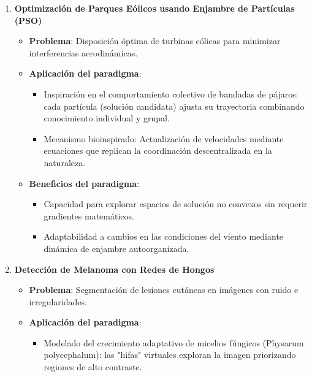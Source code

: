 \documentclass[14pt]{extarticle}
\begin{document}
  \begin{enumerate}
    \item \textbf{Optimización de Parques Eólicos usando Enjambre de Partículas (PSO)}

    \begin{itemize}
      \item \textbf{Problema}: Disposición óptima de turbinas eólicas para minimizar interferencias aerodinámicas.
      
      \item \textbf{Aplicación del paradigma}:

        \begin{itemize}
          \item Inspiración en el comportamiento colectivo de bandadas de pájaros: cada partícula (solución candidata) ajusta su trayectoria combinando conocimiento individual y grupal.
          
          \item Mecanismo bioinspirado: Actualización de velocidades mediante ecuaciones que replican la coordinación descentralizada en la naturaleza.
        \end{itemize}
        
      \item \textbf{Beneficios del paradigma}:

        \begin{itemize}
          \item Capacidad para explorar espacios de solución no convexos sin requerir gradientes matemáticos.

          \item Adaptabilidad a cambios en las condiciones del viento mediante dinámica de enjambre autoorganizada.
        \end{itemize}
    \end{itemize}

    \item \textbf{Detección de Melanoma con Redes de Hongos}
    
      \begin{itemize}
        \item \textbf{Problema}: Segmentación de lesiones cutáneas en imágenes con ruido e irregularidades.
        
        \item \textbf{Aplicación del paradigma}:

          \begin{itemize}
            \item Modelado del crecimiento adaptativo de micelios fúngicos (Physarum polycephalum): las "hifas" virtuales exploran la imagen priorizando regiones de alto contraste.
            

\end{itemize}
\end{itemize}
\end{enumerate}
\end{document}
